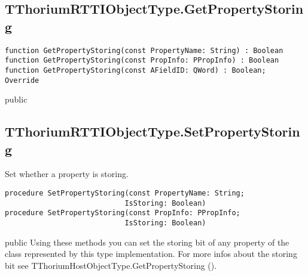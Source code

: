 \subsection{TThoriumRTTIObjectType.GetPropertyStoring}
\label{thoriumcorepkg:thorium:tthoriumrttiobjecttype:getpropertystoring}
\begin{FPCList}
\Declaration 

\begin{verbatim}
function GetPropertyStoring(const PropertyName: String) : Boolean
function GetPropertyStoring(const PropInfo: PPropInfo) : Boolean
function GetPropertyStoring(const AFieldID: QWord) : Boolean;  Override
\end{verbatim}
\Visibility
public
\end{FPCList}
\subsection{TThoriumRTTIObjectType.SetPropertyStoring}
\label{thoriumcorepkg:thorium:tthoriumrttiobjecttype:setpropertystoring}
\begin{FPCList}
\Synopsis
Set whether a property is storing.\Declaration 

\begin{verbatim}
procedure SetPropertyStoring(const PropertyName: String;
                            IsStoring: Boolean)
procedure SetPropertyStoring(const PropInfo: PPropInfo;
                            IsStoring: Boolean)
\end{verbatim}
\Visibility
public
\Description
Using these methods you can set the storing bit of any property of the class represented by this type implementation. For more infos about the storing bit see TThoriumHostObjectType.GetPropertyStoring (\pageref{thoriumcorepkg:thorium:tthoriumhostobjecttype:getpropertystoring}).\end{FPCList}
